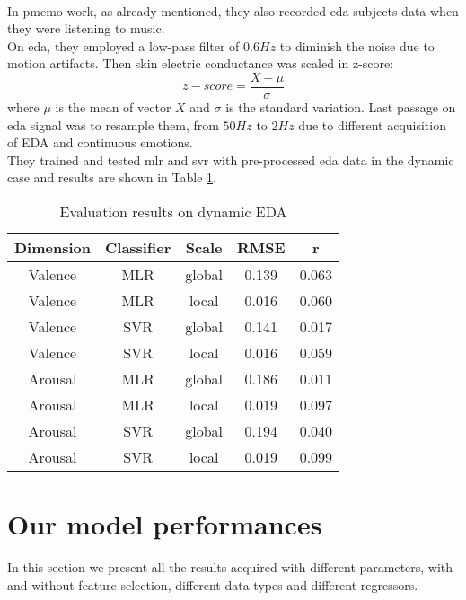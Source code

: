 \\
In \gls{pmemo} work, as already mentioned, they also recorded \gls{eda} subjects data when they were listening to music.
\\
On \gls{eda}, they employed a low-pass filter of $0.6Hz$ to diminish the noise due to motion artifacts.
\newpage
Then skin electric conductance was scaled in z-score:
\begin{equation}
	z-score=\dfrac{X-\mu}{\sigma}
\end{equation}
where $\mu$ is the mean of vector $X$ and $\sigma$ is the standard variation.
Last passage on \gls{eda} signal was to resample them, from $50Hz$ to $2Hz$ due to different acquisition of EDA and continuous emotions.
\\
They trained and tested \gls{mlr} and \gls{svr} with pre-processed \gls{eda} data in the dynamic case and results are shown in Table \ref{table:PMEmo_results_EDA}.
\begin{table}[h!]
	\centering
	\begin{tabular}{|c|c|c|c|c|}
		\hline
		Dimension & Classifier & Scale & RMSE & r \\ [0.5ex] 
		\hline\hline Valence & MLR & global & 0.139 & 0.063 \\
		\hline Valence & MLR & local & 0.016 & 0.060 \\
		\hline Valence & SVR & global & 0.141 & 0.017 \\
		\hline Valence & SVR & local & 0.016 & 0.059 \\
		\hline Arousal & MLR & global & 0.186 & 0.011 \\
		\hline Arousal & MLR & local & 0.019 & 0.097 \\
		\hline Arousal & SVR & global & 0.194 & 0.040 \\
		\hline Arousal & SVR & local & 0.019 & 0.099 \\
		\hline
	\end{tabular}
	\caption{Evaluation results on dynamic EDA}
	\label{table:PMEmo_results_EDA}
\end{table}

\newpage
\section{Our model performances}
In this section we present all the results acquired with different parameters, with and without feature selection, different data types and different regressors.

